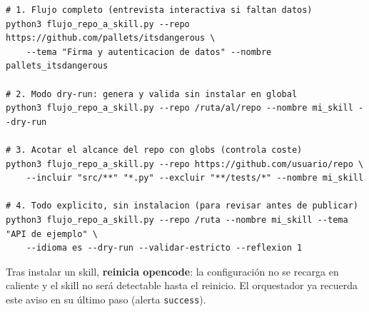\documentclass[11pt,a4paper]{article}
\begin{document}
\begin{tcolorbox}[cajaContenido, title={\faIcon{terminal}~Ejemplos de uso del orquestador}]
\begin{lstlisting}[style=estiloBash]
# 1. Flujo completo (entrevista interactiva si faltan datos)
python3 flujo_repo_a_skill.py --repo https://github.com/pallets/itsdangerous \
    --tema "Firma y autenticacion de datos" --nombre pallets_itsdangerous

# 2. Modo dry-run: genera y valida sin instalar en global
python3 flujo_repo_a_skill.py --repo /ruta/al/repo --nombre mi_skill --dry-run

# 3. Acotar el alcance del repo con globs (controla coste)
python3 flujo_repo_a_skill.py --repo https://github.com/usuario/repo \
    --incluir "src/**" "*.py" --excluir "**/tests/*" --nombre mi_skill

# 4. Todo explicito, sin instalacion (para revisar antes de publicar)
python3 flujo_repo_a_skill.py --repo /ruta --nombre mi_skill --tema "API de ejemplo" \
    --idioma es --dry-run --validar-estricto --reflexion 1
\end{lstlisting}
\end{tcolorbox}

\begin{cajaRecuerda}
Tras instalar un skill, \textbf{reinicia opencode}: la configuración no se recarga en
caliente y el skill no será detectable hasta el reinicio. El orquestador ya recuerda este
aviso en su último paso (alerta \texttt{success}).
\end{cajaRecuerda}
\end{document}
